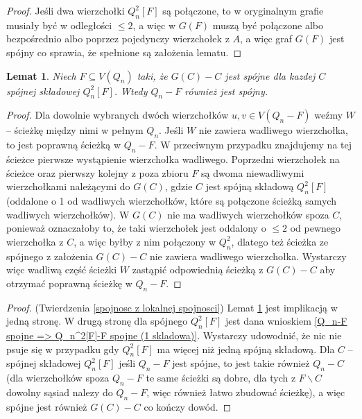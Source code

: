 \documentclass{pracamgr}
\newtheorem{lemma}[theorem]{Lemat}
\begin{document}
    \begin{proof}
     Jeśli dwa wierzchołki $Q_n^2[F]$ są połączone, to w oryginalnym grafie musiały być w odległości $\le 2$, a więc w $G(F)$ muszą być połączone
     albo bezpośrednio albo poprzez pojedynczy wierzchołek z $A$, a więc graf $G(F)$ jest spójny co sprawia,
     że spełnione są założenia lematu.
    \end{proof}
    \begin{lemma}\label{Q_n^2[F]-F spojne => Q_n-F spojne}
     Niech $F\subseteq V(Q_n)$ taki, że $G(C)-C$ jest spójne dla kazdej $C$ spójnej składowej $Q_n^2[F]$. Wtedy $Q_n-F$ również jest spójny.
    \end{lemma}
    \begin{proof}
     Dla dowolnie wybranych dwóch wierzchołków $u,v\in V(Q_n-F)$ weźmy $W$ -- ścieżkę między nimi w pełnym $Q_n$. Jeśli $W$ nie zawiera wadliwego wierzchołka,
     to jest poprawną ścieżką w $Q_n-F$. W przeciwnym przypadku znajdujemy na tej ścieżce pierwsze wystąpienie wierzchołka wadliwego.
     Poprzedni wierzchołek na ścieżce oraz pierwszy kolejny z poza zbioru $F$ są dwoma niewadliwymi wierzchołkami należącymi do $G(C)$, gdzie $C$
     jest spójną składową $Q_n^2[F]$ (oddalone o 1 od wadliwych wierzchołków, które są połączone ścieżką samych wadliwych wierzchołków).
     W $G(C)$ nie ma wadliwych wierzchołków spoza $C$, ponieważ oznaczałoby to, że taki wierzchołek jest oddalony o $\le 2$ od pewnego wierzchołka z $C$,
     a więc byłby z nim połączony w $Q_n^2$, dlatego też ścieżka ze spójnego z założenia $G(C)-C$ nie zawiera wadliwego wierzchołka.
     Wystarczy więc wadliwą część ścieżki $W$ zastąpić odpowiednią ścieżką z $G(C)-C$ aby otrzymać poprawną ścieżkę w $Q_n-F$.
    \end{proof}
    \begin{proof}
     (Twierdzenia \ref{spojnosc z lokalnej spojnosci})\newline
     Lemat \ref{Q_n^2[F]-F spojne => Q_n-F spojne} jest implikacją w jedną stronę.
     W drugą stronę dla spójnego $Q_n^2[F]$ jest dana wnioskiem \ref{Q_n-F spojne => Q_n^2[F]-F spojne (1 skladowa)}.
     Wystarczy udowodnić, że nic nie psuje się w przypadku gdy $Q_n^2[F]$ ma więcej niż jedną spójną składową.
     Dla $C$ -- spójnej składowej $Q_n^2[F]$ jeśli $Q_n-F$ jest spójne, to jest takie również $Q_n-C$
     (dla wierzchołków spoza $Q_n-F$ te same ścieżki są dobre, dla tych z  $F\backslash C$ dowolny sąsiad nalezy do $Q_n-F$, więc również łatwo zbudować ścieżkę),
     a więc spójne jest również $G(C)-C$ co kończy dowód.
    \end{proof}
\end{document}
